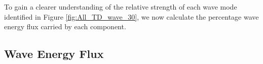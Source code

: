 To gain a clearer understanding of the relative strength of each wave mode identified in Figure \ref{fig:All_TD_wave_30}, we now calculate the percentage wave energy flux carried by each component.

%	
%	

\subsection{Wave Energy Flux}\label{sec:energy_flux}

